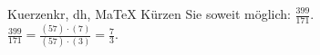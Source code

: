 \begin{MAufgabe}{Kuerzen}{kr, dh, MaTeX}
K\"urzen Sie soweit m\"oglich: $\frac{399}{171}$.\\ 
\ifLsg\MLoesung
\quad $\frac{399}{171}=\frac{(57)\cdot(7)}{(57)\cdot(3)}=\frac{7}{3}$.\else\relax\fi
 \end{MAufgabe}